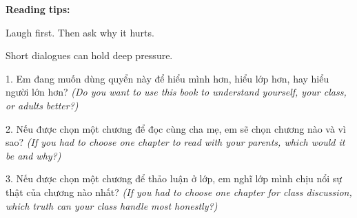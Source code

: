 \begin{ghinhoanh}
\textbf{Reading tips:}

Laugh first. Then ask why it hurts.

Short dialogues can hold deep pressure.
\end{ghinhoanh}

\begin{tuhocnhanh}
1. Em đang muốn dùng quyển này để hiểu mình hơn, hiểu lớp hơn, hay hiểu người lớn hơn? \textit{(Do you want to use this book to understand yourself, your class, or adults better?)}

2. Nếu được chọn một chương để đọc cùng cha mẹ, em sẽ chọn chương nào và vì sao? \textit{(If you had to choose one chapter to read with your parents, which would it be and why?)}

3. Nếu được chọn một chương để thảo luận ở lớp, em nghĩ lớp mình chịu nổi sự thật của chương nào nhất? \textit{(If you had to choose one chapter for class discussion, which truth can your class handle most honestly?)}
\end{tuhocnhanh}

\ngancach